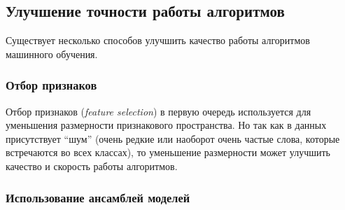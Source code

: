 \subsection{Улучшение точности работы алгоритмов}

Существует несколько способов улучшить качество работы алгоритмов машинного обучения.

\subsubsection{Отбор признаков}
Отбор признаков (\textit{feature selection}) в первую очередь используется для 
уменьшения размерности признакового пространства. Но так как в данных
присутствует ``шум'' (очень редкие или наоборот очень частые слова, которые
встречаются во всех классах), то уменьшение размерности может улучшить качество и скорость работы алгоритмов. 

\subsubsection{Использование ансамблей моделей}